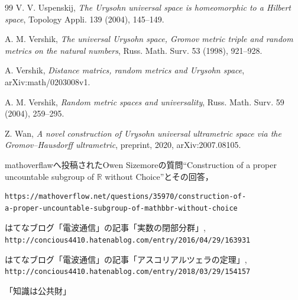 \documentclass[leqno, 12pt]{jsarticle}
\newcommand{\rr}{\mathbb{R}}
\begin{document}
\begin{thebibliography}{99}
V. V. Uspenskij, 
\textit{The Urysohn universal space is homeomorphic to a Hilbert space}, 
Topology Appli. 139 (2004), 145--149. 


A. M. Vershik, 
\textit{The universal Urysohn space, Gromov metric triple and random metrics on the natural numbers}, 
Russ. Math. Surv. 53 (1998), 921--928. 


A. Vershik, 
\textit{Distance matrics, random metrics and Urysohn space}, 
arXiv:math/0203008v1.

A. M. Vershik, 
\textit{Random metric spaces and universality}, 
Russ. Math. Surv. 59 (2004), 259--295. 

Z. Wan, 
\textit{A novel construction of Urysohn universal ultrametric space via the Gromov--Hausdorff ultrametric}, preprint, 2020,  arXiv:2007.08105.


mathoverflawへ投稿されたOwen Sizemoreの質問``Construction of a proper uncountable subgroup of $\rr$ without Choice''とその回答，
\begin{verbatim}
https://mathoverflow.net/questions/35970/construction-of-
a-proper-uncountable-subgroup-of-mathbbr-without-choice
\end{verbatim}

はてなブログ「電波通信」の記事「実数の閉部分群」, 
\verb|http://concious4410.hatenablog.com/entry/2016/04/29/163931|



はてなブログ「電波通信」の記事「アスコリアルツェラの定理」,
 \verb|http://concious4410.hatenablog.com/entry/2018/03/29/154157|


\end{thebibliography}


\medskip
\begin{center}
「知識は公共財」
\end{center}
			
\end{document}
